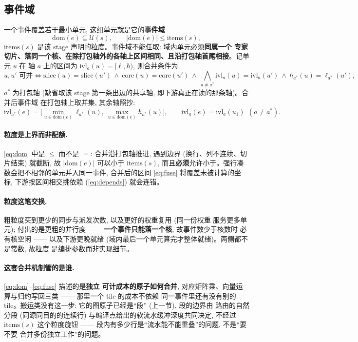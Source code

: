 \documentclass[11pt,a4paper]{article}
\newcommand{\dom}{\mathrm{dom}}
\newcommand{\unit}{\mathcal{U}}
\begin{document}
\subsection{事件域}
\label{sec:domain}

一个事件覆盖若干最小单元, 这组单元就是它的\textbf{事件域}
\begin{equation}
\dom(e) \subseteq \unit(s), \qquad
\big|\dom(e)\big| \le \mathrm{items}(s),
\label{eq:dom}
\end{equation}
$\mathrm{items}(s)$ 是该 stage 声明的粒度。事件域不能任取: 域内单元必须\textbf{同属一个
专家切片、落同一个核、在除打包轴外的各轴上区间相同、且沿打包轴首尾相接}。记单元 $u$ 在
轴 $a$ 上的区间为 $\mathrm{ivl}_a(u) = [\ell, \hbar)$, 则合并条件为
\begin{equation}
u, u' \text{ 可并} \iff
\text{slice}(u)=\text{slice}(u') \ \wedge\
\text{core}(u)=\text{core}(u') \ \wedge\
\bigwedge_{a \ne a^*} \mathrm{ivl}_a(u)=\mathrm{ivl}_a(u') \ \wedge\
\hbar_{a^*}(u) = \ell_{a^*}(u'),
\label{eq:mergeable}
\end{equation}
$a^*$ 为打包轴 (缺省取该 stage 第一条出边的共享轴, 即下游真正在读的那条轴)。合并后事件域
在打包轴上取并集, 其余轴照抄:
\begin{equation}
\mathrm{ivl}_{a^*}(e) = \Big[\min_{u\in\dom(e)} \ell_{a^*}(u),\ \max_{u\in\dom(e)} \hbar_{a^*}(u)\Big],
\qquad
\mathrm{ivl}_{a}(e) = \mathrm{ivl}_{a}(u_1)\ \ (a \ne a^*).
\label{eq:fuse}
\end{equation}

\paragraph{粒度是上界而非配额.} \eqref{eq:dom} 中是 $\le$ 而不是 $=$: 合并沿打包轴推进,
遇到边界 (换行、列不连续、切片结束) 就截断, 故 $|\dom(e)|$ 可以小于 $\mathrm{items}(s)$,
而且\textbf{必须}允许小于。强行凑数会把不相邻的单元并入同一事件, 合并后的区间
\eqref{eq:fuse} 将覆盖未被计算的坐标, 下游按区间相交挑依赖 (\eqref{eq:depends}) 就会连错。

\paragraph{粒度这笔交换.} 粗粒度买到更少的同步与派发次数, 以及更好的权重复用 (同一份权重
服务更多单元); 付出的是更粗的并行度 —— \textbf{一个事件只能落一个核}, 故事件数少于核数时
必有核空闲 —— 以及下游更晚就绪 (域内最后一个单元算完才整体就绪)。两侧都不是常数, 故粒度
是编排参数而非实现细节。

\paragraph{这套合并机制管的是谁.} \eqref{eq:dom}--\eqref{eq:fuse} 描述的是\textbf{独立
可计成本的原子如何合并}, 对应矩阵乘、向量运算与归约写回三类 —— 那里一个 tile 的成本不依赖
同一事件里还有没有别的 tile。搬运类没有这一步: 它的图原子已经是``段'' (上一节), 段的边界由
路由的自然分段 (同源同目的的连续行) 与编译点给出的软流水缓冲深度共同决定, 不经过
$\mathrm{items}(s)$ 这个粒度旋钮 —— 段内有多少行是``流水能不能重叠''的问题, 不是``要不要
合并多份独立工作''的问题。
\end{document}
